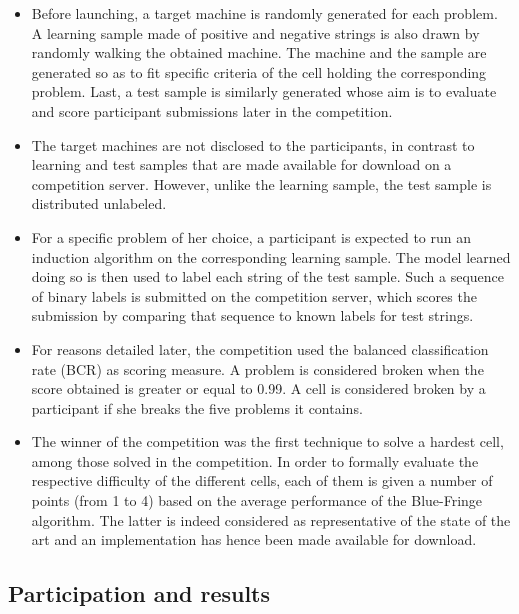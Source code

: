 \begin{itemize}
\item Before launching, a target machine is randomly generated for each problem. A learning sample made of positive and negative strings is also drawn by randomly walking the obtained machine. The machine and the sample are generated so as to fit specific criteria of the cell holding the corresponding problem. Last, a test sample is similarly generated whose aim is to evaluate and score participant submissions later in the competition.
\item The target machines are not disclosed to the participants, in contrast to learning and test samples that are made available for download on a competition server. However, unlike the learning sample, the test sample is distributed unlabeled. 
\item For a specific problem of her choice, a participant is expected to run an induction algorithm on the corresponding learning sample. The model learned doing so is then used to label each string of the test sample. Such a sequence of binary labels is submitted on the competition server, which scores the submission by comparing that sequence to known labels for test strings. 
\item For reasons detailed later, the competition used the balanced classification rate (BCR) as scoring measure. A problem is considered broken when the score obtained is greater or equal to 0.99. A cell is considered broken by a participant if she breaks the five problems it contains. 
\item The winner of the competition was the first technique to solve a hardest cell, among those solved in the competition. In order to formally evaluate the respective difficulty of the different cells, each of them is given a number of points (from 1 to 4) based on the average performance of the Blue-Fringe algorithm. The latter is indeed considered as representative of the state of the art and an implementation has hence been made available for download. 
\end{itemize}

\subsection{Participation and results\label{subsection_stamina_results}}

